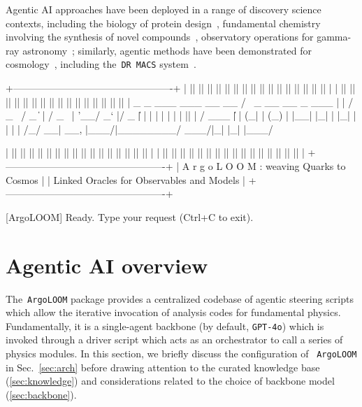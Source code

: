 \documentclass[final,3p,times,sort,compress]{elsarticle}
\newcommand{\AL}{\texttt{ArgoLOOM}\xspace}
\begin{document}
Agentic AI approaches have been deployed in a range of discovery
science contexts, including the biology of protein design~\cite{ghafarollahi2025sparksmultiagentartificialintelligence},
fundamental chemistry involving the synthesis of novel compounds~\cite{bran2023chemcrowaugmentinglargelanguagemodels,doi:10.1021/acsomega.4c08408},
observatory operations for gamma-ray astronomy~\cite{kostunin2025aiagentsgroundbasedgamma};
similarly, agentic methods have been demonstrated for cosmology~\cite{Laverick:2024fyh,Moss:2025ynt, tam2025infera}, including
the~\texttt{DR MACS} system~\cite{DRMACS}.

\begin{python}
+-------------------------------------------------+
| || || || || || || || || || || || || || || || || |
| || || || || || || || || || || || || || || || || |
     _                    _     ___   ___  __  __ 
    / \   _ __ __ _  ___ | |   / _ \ / _ \|  \/  |
   / _ \ | '__/ _` |/ _ \| |  | | | | | | | |\/| |
  / ___ \| | | (_| | (_) | |__| |_| | |_| | |  | |
 /_/   \_\_|  \__, |\___/|_____\___/ \___/|_|  |_|
              |___/                               

| || || || || || || || || || || || || || || || || |
| || || || || || || || || || || || || || || || || |
+-------------------------------------------------+
|  A r g o L O O M  :  weaving Quarks to Cosmos   |
|  Linked Oracles  for  Observables and Models    |
+-------------------------------------------------+
    
[ArgoLOOM] Ready. Type your request (Ctrl+C to exit).
\end{python}

\section{Agentic AI overview}
\label{sec:framework}
%
%
The~\AL package provides a centralized codebase of agentic steering scripts which
allow the iterative invocation of analysis codes for fundamental physics.
%
Fundamentally, it is a single-agent backbone (by default, \texttt{GPT-4o}) which is invoked
through a driver script which acts as an orchestrator to call a series of physics modules.
%
In this section, we briefly discuss the configuration of ~\AL in
Sec.~\ref{sec:arch} before drawing attention to the curated knowledge base (\ref{sec:knowledge}) and considerations
related to the choice of backbone model (\ref{sec:backbone}).
%

%
%
\end{document}
